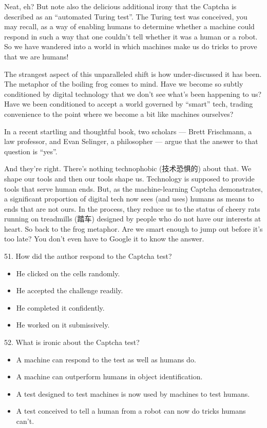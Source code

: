 \documentclass[UTF8,11pt]{ctexart}
\begin{document}
Neat, eh? But note also the delicious additional irony that the Captcha is described as an “automated Turing test”. The Turing test was conceived, you may recall, as a way of enabling humans to determine whether a machine could respond in such a way that one couldn’t tell whether it was a human or a robot. So we have wandered into a world in which machines make us do tricks to prove that we are humans!


The strangest aspect of this unparalleled shift is how under-discussed it has been. The metaphor of the boiling frog comes to mind. Have we become so subtly conditioned by digital technology that we don’t see what’s been happening to us? Have we been conditioned to accept a world governed by “smart” tech, trading convenience to the point where we become a bit like machines ourselves?


In a recent startling and thoughtful book, two scholars — Brett Frischmann, a law professor, and Evan Selinger, a philosopher — argue that the answer to that question is “yes”.


And they’re right. There’s nothing technophobic (技术恐惧的) about that. We shape our tools and then our tools shape us. Technology is supposed to provide tools that serve human ends. But, as the machine-learning Captcha demonstrates, a significant proportion of digital tech now sees (and uses) humans as means to ends that are not ours. In the process, they reduce us to the status of cheery rats running on treadmills (踏车) designed by people who do not have our interests at heart. So back to the frog metaphor. Are we smart enough to jump out before it’s too late? You don’t even have to Google it to know the answer.


51. How did the author respond to the Captcha test?


\begin{itemize}[leftmargin=2em,itemsep=.2em,topsep=.4em]\item[A.] He clicked on the cells randomly.
\item[B.] He accepted the challenge readily.
\item[C.] He completed it confidently.
\item[D.] He worked on it submissively.
\end{itemize}

52. What is ironic about the Captcha test?


\begin{itemize}[leftmargin=2em,itemsep=.2em,topsep=.4em]\item[A.] A machine can respond to the test as well as humans do.
\item[B.] A machine can outperform humans in object identification.
\item[C.] A test designed to test machines is now used by machines to test humans.
\item[D.] A test conceived to tell a human from a robot can now do tricks humans can’t.
\end{itemize}
\end{document}
